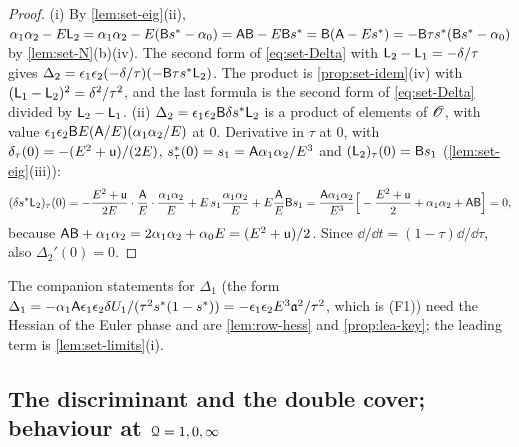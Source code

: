 \begin{proof}
(i) By \cref{lem:set-eig}(ii), $\alpha_1\alpha_2-E\mathsf{L}_2=\alpha_1\alpha_2-E(\mathsf{B}s^{\ast}-\alpha_0)=\mathsf{A}\mathsf{B}-E\mathsf{B}s^{\ast}=\mathsf{B}(\mathsf{A}-Es^{\ast})=-\mathsf{B}\tau s^{\ast}(\mathsf{B}s^{\ast}-\alpha_0)$ by \cref{lem:set-N}(b)(iv). The second form of \eqref{eq:set-Delta} with $\mathsf{L}_2-\mathsf{L}_1=-\delta/\tau$ gives $\Delta_2=\epsilon_1\epsilon_2(-\delta/\tau)(-\mathsf{B}\tau s^{\ast}\mathsf{L}_2)$. The product is \cref{prop:set-idem}(iv) with $(\mathsf{L}_1-\mathsf{L}_2)^2=\delta^2/\tau^2$, and the last formula is the second form of \eqref{eq:set-Delta} divided by $\mathsf{L}_2-\mathsf{L}_1$.
(ii) $\Delta_2=\epsilon_1\epsilon_2\mathsf{B}\delta s^{\ast}\mathsf{L}_2$ is a product of elements of $\mathscr{O}$, with value $\epsilon_1\epsilon_2\mathsf{B} E(\mathsf{A}/E)(\alpha_1\alpha_2/E)$ at $0$. Derivative in $\tau$ at $0$, with $\delta_\tau(0)=-(E^2+\mathsf{u})/(2E)$, $s^{\ast}_\tau(0)=s_1=\mathsf{A}\alpha_1\alpha_2/E^3$ and $(\mathsf{L}_2)_\tau(0)=\mathsf{B} s_1$ (\cref{lem:set-eig}(iii)):
\[
(\delta s^{\ast}\mathsf{L}_2)_\tau(0)=-\frac{E^2+\mathsf{u}}{2E}\cdot\frac{\mathsf{A}}{E}\cdot\frac{\alpha_1\alpha_2}{E}+E\,s_1\frac{\alpha_1\alpha_2}{E}+E\frac{\mathsf{A}}{E}\mathsf{B} s_1
=\frac{\mathsf{A}\alpha_1\alpha_2}{E^3}\Big[-\frac{E^2+\mathsf{u}}{2}+\alpha_1\alpha_2+\mathsf{A}\mathsf{B}\Big]=0,
\]
because $\mathsf{A}\mathsf{B}+\alpha_1\alpha_2=2\alpha_1\alpha_2+\alpha_0E=(E^2+\mathsf{u})/2$. Since $\dd/\dd t=(1-\tau)\dd/\dd\tau$, also $\Delta_2'(0)=0$.
\end{proof}

The companion statements for $\Delta_1$ (the form $\Delta_1=-\alpha_1\mathsf{A}\epsilon_1\epsilon_2\delta U_1/(\tau^2s^{\ast}(1-s^{\ast}))=-\epsilon_1\epsilon_2E^3\mathfrak{a}^2/\tau^2$, which is (F1)) need the Hessian of the Euler phase and are \cref{lem:row-hess} and \cref{prop:lea-key}; the leading term is \cref{lem:set-limits}(i).

\subsection{The discriminant and the double cover; behaviour at \texorpdfstring{$\mathcal{Q}=1,0,\infty$}{Q = 1, 0, infinity}}
\label{sec:set-disc}

